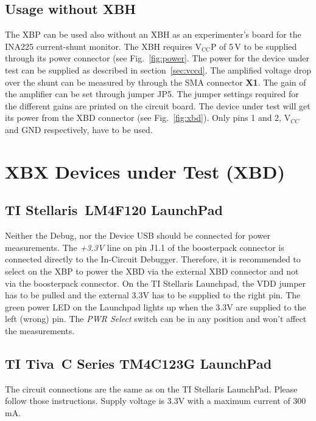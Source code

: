 \documentclass[twoside,11pt]{cergdoc}
\begin{document}
\section{Usage without XBH}
The XBP can be used also without an XBH as an experimenter's board for the INA225 
current-shunt monitor. The XBH requires $\mathrm{V_{CC}P}$ of 5\,V to be supplied
through its power connector (see Fig.~\ref{fig:power}. The power for the device 
under test can be supplied as described in section~\ref{sec:vccd}. The amplified
voltage drop over the shunt can be measured by through the SMA connector \textbf{X1}.
The gain of the amplifier can be set through jumper JP5. The jumper settings required
for the different gains are printed on the circuit board. The device under test will
get its power from the XBD connector (see Fig.~\ref{fig:xbd}). Only pins 1 and 2,
V$_{CC}$ and GND respectively, have to be used.

\chapter{XBX Devices under Test (XBD)}\label{sec:xbd}

\section{TI Stellaris\textregistered~LM4F120 LaunchPad}

Neither the Debug, nor the Device USB should be connected for power measurements.
The \emph{+3.3V} line on pin J1.1 of the boosterpack connector is connected 
directly to the In-Circuit Debugger. Therefore, it is recommended to select on the
XBP to power the XBD via the external XBD connector and not via the boosterpack
connector. On the TI Stellaris Launchpad, the VDD jumper has to be pulled and the
external 3.3V has to be supplied to the right pin. The green power LED on the
Launchpad lights up when the 3.3V are supplied to the left (wrong) pin. 
The \emph{PWR Select} switch can be in any position and won't affect the 
measurements.

\section{TI Tiva\texttrademark~C Series TM4C123G LaunchPad}

The circuit connections are the same as on the TI Stellaris LaunchPad. Please follow
those instructions. Supply voltage is 3.3V with a maximum current of 300\,mA.
\end{document}
